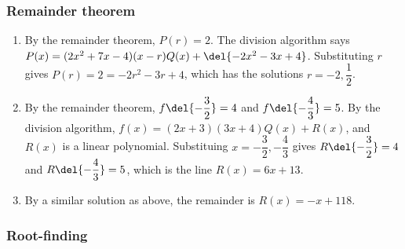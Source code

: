 \documentclass[10pt,paper=letter]{scrartcl}
\begin{document}
\subsubsection*{Remainder theorem}

\begin{enumerate}

\item By the remainder theorem, $P(r) = 2$. The division algorithm says $P(x) = (2x^2 + 7x - 4)(x-r)Q(x) + \del{-2x^2 - 3x + 4}$. Substituting $r$ gives $P(r) = 2 = -2r^2 - 3r + 4$, which has the solutions $r = -2, \dfrac12$.

\item By the remainder theorem, $f\del{-\dfrac32} = 4$ and $f\del{-\dfrac43} = 5$. By the division algorithm, $f(x) = (2x+3)(3x+4)Q(x) + R(x)$, and $R(x)$ is a linear polynomial. Substituing $x = -\dfrac32, -\dfrac43$ gives $R\del{-\dfrac32} = 4$ and $R\del{-\dfrac43} = 5$, which is the line $R(x) = 6x + 13$.

\item By a similar solution as above, the remainder is $R(x) = -x + 118$.

\end{enumerate}

\subsubsection*{Root-finding}
\end{document}
